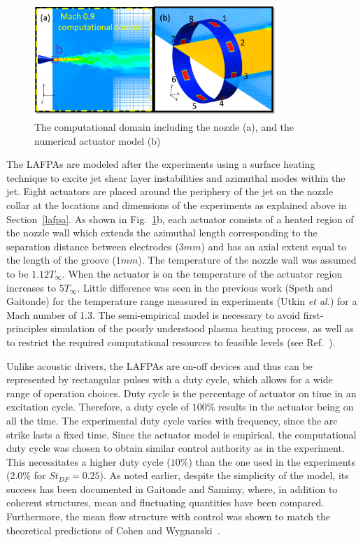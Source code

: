 \documentclass[english]{aiaa-tc}
\begin{document}
\begin{figure}[h]
\begin{center}
\includegraphics[width=3.6in]{actuatormodelnew}
\caption{The computational domain including the nozzle  (a), and the numerical actuator model (b)}\label{fig:actuator}
\end{center}
\end{figure}
The LAFPAs are modeled after the experiments using a surface heating
technique to excite jet shear layer instabilities and azimuthal modes
within the jet.  Eight actuators are placed around the periphery of
the jet on the nozzle collar at the locations and dimensions of the
experiments as explained above in Section~\ref{lafpa}. As shown in
Fig.~\ref{fig:actuator}b, each actuator consists of a heated region of
the nozzle wall which extends the azimuthal length corresponding to
the separation distance between electrodes ($3 mm$) and has an axial
extent equal to the length of the groove ($1 mm$). The temperature of
the nozzle wall was assumed to be $1.12T_{\infty}$.  When the actuator
is on the temperature of the actuator region increases to
$5T_{\infty}$. Little difference was seen in the previous work (Speth
and Gaitonde\cite{SpethASM2012}) for the temperature range measured in
experiments (Utkin {\em et al.}\cite{uyg2007-2}) for a Mach number of
1.3.  The semi-empirical model is necessary to avoid first-principles
simulation of the poorly understood plasma heating process, as well as
to restrict the required computational resources to feasible levels
(see Ref.~).

Unlike acoustic drivers, the LAFPAs are on-off devices and thus can be
represented by rectangular pulses with a duty cycle, which allows for
a wide range of operation choices.  Duty cycle is the percentage of
actuator on time in an excitation cycle. Therefore, a duty cycle
of $100\%$ results in the actuator being on all the time.  
The experimental duty cycle varies with frequency, since the arc
strike lasts a fixed time.  Since the actuator
model is empirical, the computational duty cycle was chosen to obtain
similar control authority as in the experiment.  This necessitates a
higher
duty cycle ($10\%$) than the one used in the experiments
($2.0\%$ for $St_{DF}=0.25$).
As noted earlier, despite the simplicity of the model, its success
has been documented in Gaitonde 
and Samimy\cite{gdv2011-POF}, where, in addition to coherent
structures, mean and fluctuating quantities have been compared.
Furthermore, the mean flow structure with control was shown to match
the theoretical predictions of Cohen and Wygnanski~\cite{cj87-2}.
\end{document}
